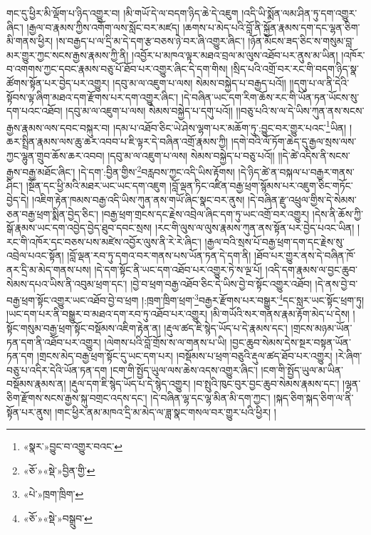 གང་དུ་ཕྱིར་མི་ལྡོག་པ་ཉིད་འགྱུར་བ། །མི་གཡོ་དེ་ལ་བདག་ཉིད་ཆེ་དེ་འཇུག །འདི་ཡི་སྨོན་ལམ་ཤིན་ཏུ་དག་འགྱུར་ཞིང་། །རྒྱལ་བ་རྣམས་ཀྱིས་འགོག་ལས་སློང་བར་མཛད། །ཆགས་པ་མེད་པའི་བློ་ནི་སྐྱོན་རྣམས་དག་དང་ལྷན་ཅིག་མི་གནས་ཕྱིར། །ས་བརྒྱད་པ་ལ་དྲི་མ་དེ་དག་རྩ་བཅས་ཉེ་བར་ཞི་འགྱུར་ཞིང་། །ཉོན་མོངས་ཟད་ཅིང་ས་གསུམ་བླ་མར་གྱུར་ཀྱང་སངས་རྒྱས་རྣམས་ཀྱི་ནི། །འབྱོར་པ་མཁའ་ལྟར་མཐའ་བྲལ་མ་ལུས་འཐོབ་པར་ནུས་མ་ཡིན། །འཁོར་བ་འགགས་ཀྱང་དབང་རྣམས་བཅུ་པོ་ཐོབ་པར་འགྱུར་ཞིང་དེ་དག་གིས། །སྲིད་པའི་འགྲོ་བར་རང་གི་བདག་ཉིད་སྣ་ཚོགས་སྟོན་པར་བྱེད་པར་འགྱུར། །དབུ་མ་ལ་འཇུག་པ་ལས། སེམས་བསྐྱེད་པ་བརྒྱད་པའོ།། །།དགུ་པ་ལ་ནི་དེའི་སྟོབས་ལྟ་ཞིག་མཐའ་དག་རྫོགས་པར་དག་འགྱུར་ཞིང་། །དེ་བཞིན་ཡང་དག་རིག་ཆོས་རང་གི་ཡོན་ཏན་ཡོངས་སུ་དག་པའང་འཐོབ། །དབུ་མ་ལ་འཇུག་པ་ལས། སེམས་བསྐྱེད་པ་དགུ་པའོ།། །།བཅུ་པའི་ས་ལ་དེ་ཡིས་ཀུན་ནས་སངས་རྒྱས་རྣམས་ལས་དབང་བསྐུར་བ། །དམ་པ་འཐོབ་ཅིང་ཡེ་ཤེས་ལྷག་པར་མཆོག་ཏུ་:བྱུང་བར་གྱུར་པའང་\footnote{«སྣར་»བྱུང་བ་འགྱུར་བའང་}ཡིན། །ཆར་སྤྲིན་རྣམས་ལས་ཆུ་ཆར་འབབ་པ་ཇི་ལྟར་དེ་བཞིན་འགྲོ་རྣམས་ཀྱི། །དགེ་བའི་ལོ་ཏོག་ཆེད་དུ་རྒྱལ་སྲས་ལས་ཀྱང་ལྷུན་གྲུབ་ཆོས་ཆར་འབབ། །དབུ་མ་ལ་འཇུག་པ་ལས། སེམས་བསྐྱེད་པ་བཅུ་པའོ།། །།དེ་ཚེ་འདིས་ནི་སངས་རྒྱས་བརྒྱ་མཐོང་ཞིང་། །དེ་དག་:བྱིན་གྱིས་\footnote{«ཅོ་»«སྡེ་»བྱིན་གྱི་}བརླབས་ཀྱང་འདི་ཡིས་རྟོགས། །དེ་ཉིད་ཚེ་ན་བསྐལ་པ་བརྒྱར་གནས་ཤིང་། །སྔོན་དང་ཕྱི་མའི་མཐར་ཡང་ཡང་དག་འཇུག །བློ་ལྡན་ཏིང་འཛིན་བརྒྱ་ཕྲག་སྙོམས་པར་འཇུག་ཅིང་གཏོང་བྱེད་དེ། །འཇིག་རྟེན་ཁམས་བརྒྱ་འདི་ཡིས་ཀུན་ནས་གཡོ་ཞིང་སྣང་བར་ནུས། །དེ་བཞིན་རྫུ་འཕྲུལ་གྱིས་དེ་སེམས་ཅན་བརྒྱ་ཕྲག་སྨིན་བྱེད་ཅིང་། །བརྒྱ་ཕྲག་གྲངས་དང་རྗེས་འབྲེལ་ཞིང་དག་ཏུ་ཡང་འགྲོ་བར་འགྱུར། །དེས་ནི་ཆོས་ཀྱི་སྒོ་རྣམས་ཡང་དག་འབྱེད་བྱེད་ཐུབ་དབང་སྲས། །རང་གི་ལུས་ལ་ལུས་རྣམས་ཀུན་ནས་སྟོན་པར་བྱེད་པའང་ཡིན། །རང་གི་འཁོར་དང་བཅས་པས་མཛེས་འབྱོར་ལུས་ནི་རེ་རེ་ཞིང་། །རྒྱལ་བའི་སྲས་པོ་བརྒྱ་ཕྲག་དག་དང་རྗེས་སུ་འབྲེལ་པའང་སྟོན། །བློ་ལྡན་རབ་ཏུ་དགའ་བར་གནས་པས་ཡོན་ཏན་དེ་དག་ནི། །ཐོབ་པར་གྱུར་ནས་དེ་བཞིན་ཁོ་ནར་དྲི་མ་མེད་གནས་པས། །དེ་དག་སྟོང་ནི་ཡང་དག་འཐོབ་པར་འགྱུར་ཏེ་ས་ལྔ་པོ། །འདི་དག་རྣམས་ལ་བྱང་ཆུབ་སེམས་དཔའ་ཡིས་ནི་འབུམ་ཕྲག་དང་། །བྱེ་བ་ཕྲག་བརྒྱ་འཐོབ་ཅིང་དེ་ཡིས་བྱེ་བ་སྟོང་འགྱུར་འཐོབ། །དེ་ནས་བྱེ་བ་བརྒྱ་ཕྲག་སྟོང་འགྱུར་ཡང་འཐོབ་བྱེ་བ་ཕྲག །:ཁྲག་ཁྲིག་ཕྲག་\footnote{«པེ་»ཁྲག་ཁྲིག་}བརྒྱར་རྫོགས་པར་བསྒྱུར་\footnote{«ཅོ་»«སྡེ་»བསྒྲུབ་}དང་སླར་ཡང་སྟོང་ཕྲག་ཏུ། །ཡང་དག་པར་ནི་བསྒྱུར་བ་མཐའ་དག་རབ་ཏུ་འཐོབ་པར་འགྱུར། །མི་གཡོའི་སར་གནས་རྣམ་རྟོག་མེད་པ་དེས། །སྟོང་གསུམ་བརྒྱ་ཕྲག་སྟོང་བསྡོམས་འཇིག་རྟེན་ན། །རྡུལ་ཚད་ཇི་སྙེད་ཡོད་པ་དེ་རྣམས་དང་། །གྲངས་མཉམ་ཡོན་ཏན་དག་ནི་འཐོབ་པར་འགྱུར། །ལེགས་པའི་བློ་གྲོས་ས་ལ་གནས་པ་ཡི། །བྱང་ཆུབ་སེམས་དེས་སྔར་བསྟན་ཡོན་ཏན་དག །གྲངས་མེད་བརྒྱ་ཕྲག་སྟོང་དུ་ཡང་དག་པར། །བསྡོམས་པ་ཕྲག་བཅུའི་རྡུལ་ཚད་ཐོབ་པར་འགྱུར། །རེ་ཞིག་བཅུ་པ་འདིར་དེའི་ཡོན་ཏན་དག །ངག་གི་སྤྱོད་ཡུལ་ལས་ཆེས་འདས་འགྱུར་ཞིང་། །ངག་གི་སྤྱོད་ཡུལ་མ་ཡིན་བསྡོམས་རྣམས་ན། །རྡུལ་དག་ཇི་སྙེད་ཡོད་པ་དེ་སྙེད་འགྱུར། །བ་སྤུའི་ཁུང་བུར་བྱང་ཆུབ་སེམས་རྣམས་དང་། །ལྷན་ཅིག་རྫོགས་སངས་རྒྱས་སྐུ་བགྲང་འདས་དང་། །དེ་བཞིན་ལྷ་དང་ལྷ་མིན་མི་དག་ཀྱང་། །སྐད་ཅིག་སྐད་ཅིག་ལ་ནི་སྟོན་པར་ནུས། །གང་ཕྱིར་ནམ་མཁའ་དྲི་མ་མེད་ལ་ཟླ་སྣང་གསལ་བར་གྱུར་པའི་ཕྱིར། །
